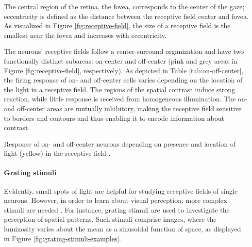 The central region of the retina, the fovea, corresponds to the center of the gaze; eccentricity is defined as the distance between the receptive field center and fovea.
As visualized in Figure \ref{fig:receptive-field}, the size of a receptive field is the smallest near the fovea and increases with eccentricity.

The neurons' receptive fields follow a center-surround organization and have two functionally distinct subareas: on-center and off-center (pink and grey areas in Figure \ref{fig:receptive-field}, respectively). As depicted in Table \ref{tab:on-off-center}, the firing response of on- and off-center cells varies depending on the location of the light in a receptive field. The regions of the spatial contrast induce strong reaction, while little response is received from homogeneous illumination. The on- and off-center areas are mutually inhibitory, making the receptive field sensitive to borders and contours and thus enabling it to encode information about contrast.

\begin{table}[!htp]
    \centering
    
    \caption[Neural response depending on light location]{Response of on- and off-center neurons depending on presence and location of light (yellow) in the receptive field \cite{KandelBook2003:25}.}
    \label{tab:on-off-center}
\end{table}

\paragraph{Grating stimuli}

Evidently, small spots of light are helpful for studying receptive fields of single neurons. However, in order to learn about visual perception, more complex stimuli are needed \cite{KandelBook2003:26}. For instance, grating stimuli are used to investigate the perception of spatial patterns. Such stimuli comprise images, where the luminosity varies about the mean as a sinusoidal function of space, as displayed in Figure \ref{fig:grating-stimuli-examples}. 

